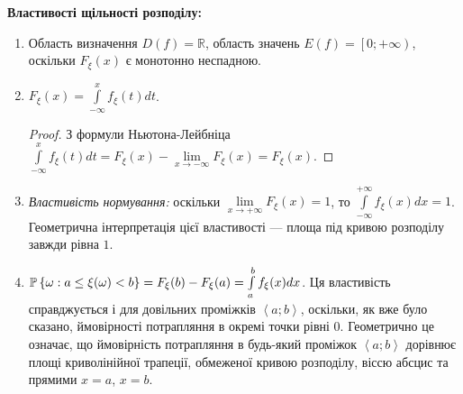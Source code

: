 \vspace{0.5em}
\noindent \textbf{Властивості щільності розподілу:}
\begin{enumerate}
    \item Область визначення $D(f) = \mathbb{R}$, область значень $E(f) = \left[0; +\infty\right)$, оскільки $F_\xi(x)$ є монотонно неспадною.
    \item $F_\xi(x)=\int\limits_{-\infty}^x f_\xi(t)dt$.
    \begin{proof}
        З формули Ньютона-Лейбніца $\int\limits_{-\infty}^x f_\xi(t)dt = F_\xi(x) - \underset{x\to-\infty}{\lim}F_\xi(x) = F_\xi(x)$.
    \end{proof}
    \item \emph{Властивість нормування:} оскільки $\lim\limits_{x \to +\infty} F_\xi(x) = 1$, то $\int\limits_{-\infty}^{+\infty} f_\xi(x)dx = 1$.
    Геометрична інтерпретація цієї властивості --- площа під кривою розподілу завжди рівна $1$.
    \item $\P\left\{\omega: a \leq \xi(\omega) < b\right\} = F_\xi(b) - F_\xi(a) = \int\limits_a^b f_\xi(x)dx$.
    Ця властивість справджується і для довільних проміжків $\left< a; b\right>$,
    оскільки, як вже було сказано, ймовірності потрапляння в окремі точки рівні 0. Геометрично це означає,
    що ймовірність потрапляння в будь-який проміжок $\left< a; b\right>$ дорівнює площі криволінійної трапеції,
    обмеженої кривою розподілу, віссю абсцис та прямими $x=a$, $x=b$.
\end{enumerate}

